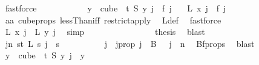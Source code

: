 \begin{isabellebody}
\ fastforce\isanewline
\ \ \ \ \ \ \ \ \isamarkupfalse%
\ \isamarkupfalse%
\ {\isacartoucheopen}{\isasymforall}y\ {\isasymin}\ cube\ {}\ t{\isachardot}{\kern0pt}\ S\ y\ j\ {\isacharequal}{\kern0pt}\ f\ j\ {\isacartoucheclose}\ \isamarkupfalse%
\ {\isachardoublequoteopen}L\ x\ j\ {\isacharequal}{\kern0pt}\ f\ j{\isachardoublequoteclose}\ \isamarkupfalse%
\ aa{\isacharparenleft}{\kern0pt}{}{\isacharparenright}{\kern0pt}\ cube{\isacharunderscore}{\kern0pt}props{\isacharparenleft}{\kern0pt}{}{\isacharcomma}{\kern0pt}{}{\isacharparenright}{\kern0pt}\ lessThan{\isacharunderscore}{\kern0pt}iff\ restrict{\isacharunderscore}{\kern0pt}apply\ \isamarkupfalse%
\ L{\isacharunderscore}{\kern0pt}def\ \isamarkupfalse%
\ fastforce\isanewline
\ \ \ \ \ \ \ \ \isamarkupfalse%
\ \isamarkupfalse%
\ {\isachardoublequoteopen}L\ x\ j\ {\isacharequal}{\kern0pt}\ L\ y\ j{\isachardoublequoteclose}\ \isamarkupfalse%
\ simp\isanewline
\ \ \ \ \ \ \isamarkupfalse%
\isanewline
\ \ \ \ \ \ \isamarkupfalse%
\ \isamarkupfalse%
\ {\isacharquery}{\kern0pt}thesis\ \isamarkupfalse%
\ blast\isanewline
\ \ \ \ \isamarkupfalse%
\isanewline
\ \ \isamarkupfalse%
\isanewline
\ \ \isamarkupfalse%
\ \isamarkupfalse%
\ {\isachardoublequoteopen}{\isacharparenleft}{\kern0pt}{\isasymexists}j{\isacharless}{\kern0pt}n{\isachardot}{\kern0pt}\ {\isasymforall}s{\isacharless}{\kern0pt}t{\isachardot}{\kern0pt}\ {\isacharparenleft}{\kern0pt}L\ s\ j\ {\isacharequal}{\kern0pt}\ s{\isacharparenright}{\kern0pt}{\isacharparenright}{\kern0pt}{\isachardoublequoteclose}\isanewline
\ \ \isamarkupfalse%
\ {\isacharminus}{\kern0pt}\isanewline
\ \ \ \ \isamarkupfalse%
\ j\ \ j{\isacharunderscore}{\kern0pt}prop{\isacharcolon}{\kern0pt}\ {\isachardoublequoteopen}j\ {\isasymin}\ B\ {}\ {\isasymand}\ j\ {\isacharless}{\kern0pt}\ n{\isachardoublequoteclose}\ \isamarkupfalse%
\ Bf{\isacharunderscore}{\kern0pt}props\ \isamarkupfalse%
\ blast\isanewline
\ \ \ \ \isamarkupfalse%
\ \isamarkupfalse%
\ {\isachardoublequoteopen}{\isasymforall}y\ {\isasymin}\ cube\ {}\ t{\isachardot}{\kern0pt}\ {\isacharparenleft}{\kern0pt}S\ y{\isacharparenright}{\kern0pt}\ j\ {\isacharequal}{\kern0pt}\ y\ {}{\isachardoublequoteclose}\ \isamarkupfalse%

\end{isabellebody}
